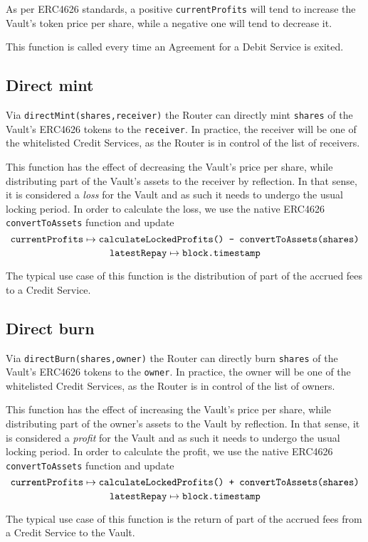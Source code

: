 \documentclass[a4paper,10 pt]{article}
\theoremstyle{definition}
\begin{document}
As per ERC4626 standards, a positive \verb|currentProfits| will tend to increase the Vault's token price per share, while a negative one will tend to decrease it.

This function is called every time an Agreement for a Debit Service is exited.

\subsection{Direct mint}\label{directMint}
Via \verb|directMint(shares,receiver)| the Router can directly mint \verb|shares| of the Vault's ERC4626 tokens to the \verb|receiver|. In practice, the receiver will be one of the whitelisted Credit Services, as the Router is in control  of the list of receivers.

This function has the effect of decreasing the Vault's price per share, while distributing part of the Vault's assets to the receiver by reflection. In that sense, it is considered a {\it loss} for the Vault and as such it needs to undergo the usual locking period. In order to calculate the loss, we use the native ERC4626 \verb|convertToAssets| function and update 
$$\verb|currentProfits| \mapsto \verb|calculateLockedProfits() - convertToAssets(shares)|$$ 
$$\verb|latestRepay| \mapsto \verb|block.timestamp|$$

The typical use case of this function is the distribution of part of the accrued fees to a Credit Service.

\subsection{Direct burn}\label{directBurn}
Via \verb|directBurn(shares,owner)| the Router can directly burn \verb|shares| of the Vault's ERC4626 tokens to the \verb|owner|. In practice, the owner will be one of the whitelisted Credit Services, as the Router is in control of the list of owners.

This function has the effect of increasing the Vault's price per share, while distributing part of the owner's assets to the Vault by reflection. In that sense, it is considered a {\it profit} for the Vault and as such it needs to undergo the usual locking period. In order to calculate the profit, we use the native ERC4626 \verb|convertToAssets| function and update 
$$\verb|currentProfits| \mapsto \verb|calculateLockedProfits() + convertToAssets(shares)|$$ 
$$\verb|latestRepay| \mapsto \verb|block.timestamp|$$

The typical use case of this function is the return of part of the accrued fees from a Credit Service to the Vault.
\end{document}

